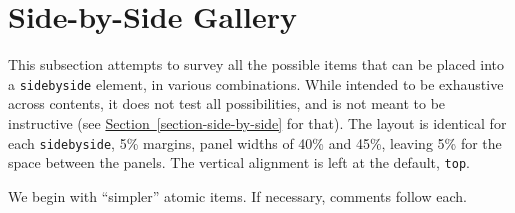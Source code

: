 \documentclass[10pt,]{article}
\theoremstyle{plain}
\theoremstyle{definition}
\theoremstyle{definition}
\theoremstyle{definition}
\theoremstyle{definition}
\theoremstyle{definition}
\theoremstyle{definition}
\numberwithin{equation}{section}
\begin{document}
\section[{Side-by-Side Gallery}]{Side-by-Side Gallery}\label{section-22}
\hypertarget{p-736}{}%
This subsection attempts to survey all the possible items that can be placed into a \lstinline?sidebyside? element, in various combinations.  While intended to be exhaustive across contents, it does not test all possibilities, and is not meant to be instructive (see \hyperref[section-side-by-side]{Section~\ref{section-side-by-side}} for that). The layout is identical for each \lstinline?sidebyside?, 5\% margins, panel widths of 40\% and 45\%, leaving 5\% for the space between the panels.  The vertical alignment is left at the default, \lstinline?top?.%
\par
\hypertarget{p-737}{}%
We begin with ``simpler'' atomic items.  If necessary, comments follow each.%
\end{document}
